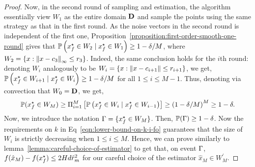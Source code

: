 \begin{proof}
Now, in the second round of sampling and estimation, the algorithm essentially view 
$W_1$ as the entire domain $\mathbf{D}$ and sample the points using the same 
strategy as that in the first round. As the noise vectors in the second round is 
independent of the first one, Proposition~\ref{proposition:first-order-smooth-one-round} 
gives that $\mathbb{P}\left(x_f^\star \in W_2 \mid x_f^\star \in W_1\right) \geq 1-\delta/M$, 
where $W_2 = \{x: \left\|{x-c_3}\right\|_\infty \leq r_3\}$. Indeed, the same conclusion holds 
for the $i$th round: denoting $W_i$ analogously to be $W_i= \{x: \left\|{x-c_{i+1}}\right\| \leq r_{i+1}\}$, we get, 
 $\mathbb{P}\left(x_f^\star \in W_{i+1} \mid x_f^\star \in W_i\right) \geq 1-\delta/M$ for 
all $1\leq i\leq M-1$. Thus, denoting via convection that $W_0 = \mathbf{D}$, we get,
\begin{equation*}
\mathbb{P} (x_f^\star \in W_M) \geq \Pi_{i=1}^M \left[	
	\mathbb{P}\left(x_f^\star \in W_{i} \mid x_f^\star \in W_{i-1}\right)\right] 
		\geq \left(1-\delta/M\right)^M \geq 1-\delta. 
\end{equation*} 
Now, we introduce the notation $\Gamma = \{x_f^\star \in W_M\}$. Then, 
$\mathbb{P}(\Gamma) \geq 1-\delta$. Now the requirements on $k$ in Eq~\eqref{eqn:lower-bound-on-k-i-fo}
guarantees that the size of $W_i$ is strictly decreasing when $1\leq i\leq M$. 
Hence, we can prove similarly to lemma~\ref{lemma:careful-choice-of-estimator} 
to get that, on event $\Gamma$, $f(\hat{x}_M) - f(x_f^\star) \leq 2 Hd \hat{r}_m^2$ for 
our careful choice of the estimator $\hat{x}_M \in W_M^\prime$. 
%
%
\end{proof}

